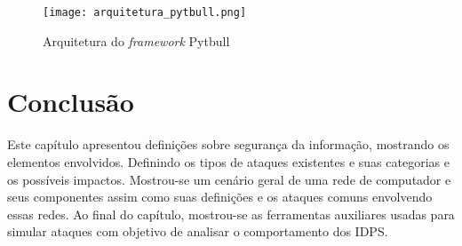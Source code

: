  \begin{figure}[htb]
  \centering
  \caption{Arquitetura do \textit{framework} Pytbull}
  \texttt{[image: arquitetura\_pytbull.png]}
  \label{fig:pytbull}
 \end{figure}

 \section{Conclusão}

 Este capítulo apresentou definições sobre segurança da informação, mostrando os elementos envolvidos. Definindo os tipos de ataques existentes e suas categorias e os possíveis impactos. Mostrou-se um cenário geral de uma rede de computador e seus componentes assim como suas definições e os ataques comuns envolvendo essas redes. Ao final do capítulo, mostrou-se as ferramentas auxiliares usadas para simular ataques com objetivo de analisar o comportamento dos IDPS.
